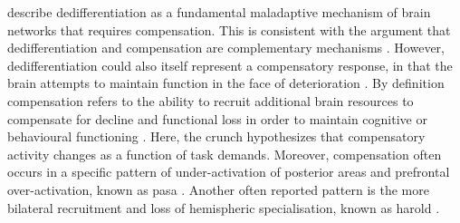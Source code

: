 \citeauthor{Fornito2015}\cite{Fornito2015} describe dedifferentiation as a fundamental maladaptive mechanism of brain networks that requires compensation. This is consistent with the argument that dedifferentiation and compensation are complementary mechanisms \cite{Reuter-Lorenz2010}. However, dedifferentiation could also itself represent a compensatory response, in that the brain attempts to maintain function in the face of deterioration \cite{Stern2009}. By definition compensation refers to the ability to recruit additional brain resources to compensate for decline and functional loss in order to maintain cognitive or behavioural functioning \cite{Reuter-Lorenz2010, Grady2012}. Here, the \gls{crunch} hypothesizes that compensatory activity changes as a function of task demands. Moreover, compensation often occurs in a specific pattern of under-activation of posterior areas and prefrontal over-activation, known as \gls{pasa} \cite{Davis2007}. Another often reported pattern is the more bilateral recruitment and loss of hemispheric specialisation, known as \gls{harold} \cite{Cabeza2002}.

